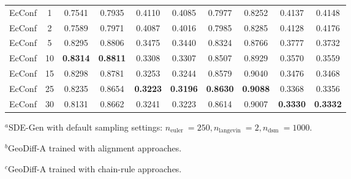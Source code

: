 \documentclass{article} %
\begin{document}
\begin{table}[htbp]
\begin{threeparttable}
\begin{tabular}{l|c|cccc|cccc}
			\midrule
			EcConf & 1     &   0.7541  & 0.7935  & 0.4110  & 0.4085  & 0.7977  & 0.8252  & 0.4137  & 0.4148  \\
			EcConf & 2     &   0.7589  & 0.7971  & 0.4087  & 0.4016  & 0.7985  & 0.8285  & 0.4128  & 0.4176  \\
			EcConf & 5     &   0.8295  & 0.8806  & 0.3475  & 0.3440  & 0.8324  & 0.8766  & 0.3777  & 0.3732  \\
			EcConf & 10    &   \textbf{0.8314 } & \textbf{0.8811 } & 0.3308  & 0.3307  & 0.8507  & 0.8929  & 0.3570  & 0.3559  \\
			EcConf & 15    &   0.8298  & 0.8781  & 0.3253  & 0.3244  & 0.8579  & 0.9040  & 0.3476  & 0.3468  \\
			EcConf & 25    &   0.8235  & 0.8654  & \textbf{0.3223 } & \textbf{0.3196 } & \textbf{0.8630 } & \textbf{0.9088 } & 0.3368  & 0.3356  \\
			EcConf & 30    &   0.8131  & 0.8662  & 0.3241  & 0.3223  & 0.8614  & 0.9007  & \textbf{0.3330 } & \textbf{0.3332 } \\
			\bottomrule
		\end{tabular}%
		
		\begin{tablenotes}
			\footnotesize
			\item$^a$SDE-Gen with default sampling settings: $n_{\text {euler }}=250, n_{\text {langevin }}=2, n_{\text {dsm }}=1000$.
			\item$^b$GeoDiff-A trained with alignment approaches.
			\item$^c$GeoDiff-A trained with chain-rule approaches.
		\end{tablenotes}
	\end{threeparttable}
	
	\label{tab2}%
\end{table}%
\end{document}
